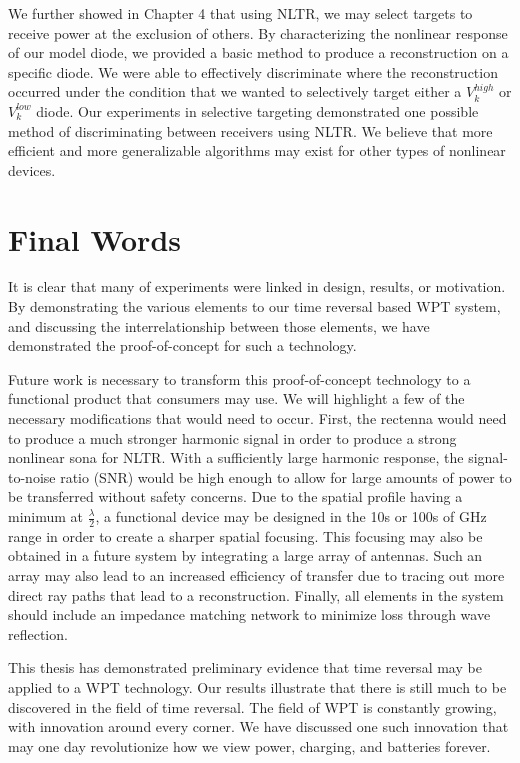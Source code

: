 We further showed in Chapter 4 that using NLTR, we may select targets to receive power at the exclusion of others. By characterizing the nonlinear response of our model diode, we provided a basic method to produce a reconstruction on a specific diode. We were able to effectively discriminate where the reconstruction occurred under the condition that we wanted to selectively target either a $V_{k}^{high}$ or $V_{k}^{low}$ diode. Our experiments in selective targeting demonstrated one possible method of discriminating between receivers using NLTR. We believe that more efficient and more generalizable algorithms may exist for other types of nonlinear devices.

\section{Final Words}

It is clear that many of experiments were linked in design, results, or motivation. By demonstrating the various elements to our time reversal based WPT system, and discussing the interrelationship between those elements, we have demonstrated the proof-of-concept for such a technology.

Future work is necessary to transform this proof-of-concept technology to a functional product that consumers may use. We will highlight a few of the necessary modifications that would need to occur. First, the rectenna would need to produce a much stronger harmonic signal in order to produce a strong nonlinear sona for NLTR. With a sufficiently large harmonic response, the signal-to-noise ratio (SNR) would be high enough to allow for large amounts of power to be transferred without safety concerns. Due to the spatial profile having a minimum at $\frac{\lambda}{2}$, a functional device may be designed in the 10s or 100s of GHz range in order to create a sharper spatial focusing. This focusing may also be obtained in a future system by integrating a large array of antennas. Such an array may also lead to an increased efficiency of transfer due to tracing out more direct ray paths that lead to a reconstruction.  Finally, all elements in the system should include an impedance matching network to minimize loss through wave reflection.

This thesis has demonstrated preliminary evidence that time reversal may be applied to a WPT technology. Our results illustrate that there is still much to be discovered in the field of time reversal. The field of WPT is constantly growing, with innovation around every corner. We have discussed one such innovation that may one day revolutionize how we view power, charging, and batteries forever.
